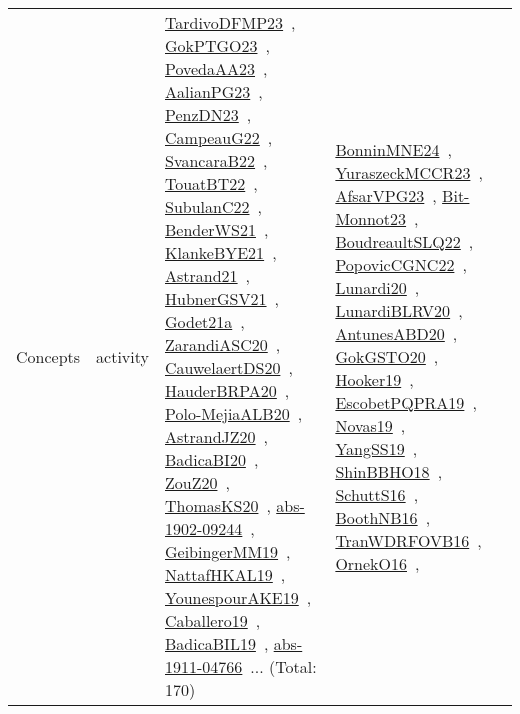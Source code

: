 {\begin{longtable}{lp{3cm}>{\raggedright\arraybackslash}p{6cm}>{\raggedright\arraybackslash}p{6cm}>{\raggedright\arraybackslash}p{8cm}}
Concepts & activity & \href{../works/TardivoDFMP23.pdf}{TardivoDFMP23}~\cite{TardivoDFMP23}, \href{../works/GokPTGO23.pdf}{GokPTGO23}~\cite{GokPTGO23}, \href{../works/PovedaAA23.pdf}{PovedaAA23}~\cite{PovedaAA23}, \href{../works/AalianPG23.pdf}{AalianPG23}~\cite{AalianPG23}, \href{../works/PenzDN23.pdf}{PenzDN23}~\cite{PenzDN23}, \href{../works/CampeauG22.pdf}{CampeauG22}~\cite{CampeauG22}, \href{../works/SvancaraB22.pdf}{SvancaraB22}~\cite{SvancaraB22}, \href{../works/TouatBT22.pdf}{TouatBT22}~\cite{TouatBT22}, \href{../works/SubulanC22.pdf}{SubulanC22}~\cite{SubulanC22}, \href{../works/BenderWS21.pdf}{BenderWS21}~\cite{BenderWS21}, \href{../works/KlankeBYE21.pdf}{KlankeBYE21}~\cite{KlankeBYE21}, \href{../works/Astrand21.pdf}{Astrand21}~\cite{Astrand21}, \href{../works/HubnerGSV21.pdf}{HubnerGSV21}~\cite{HubnerGSV21}, \href{../works/Godet21a.pdf}{Godet21a}~\cite{Godet21a}, \href{../works/ZarandiASC20.pdf}{ZarandiASC20}~\cite{ZarandiASC20}, \href{../works/CauwelaertDS20.pdf}{CauwelaertDS20}~\cite{CauwelaertDS20}, \href{../works/HauderBRPA20.pdf}{HauderBRPA20}~\cite{HauderBRPA20}, \href{../works/Polo-MejiaALB20.pdf}{Polo-MejiaALB20}~\cite{Polo-MejiaALB20}, \href{../works/AstrandJZ20.pdf}{AstrandJZ20}~\cite{AstrandJZ20}, \href{../works/BadicaBI20.pdf}{BadicaBI20}~\cite{BadicaBI20}, \href{../works/ZouZ20.pdf}{ZouZ20}~\cite{ZouZ20}, \href{../works/ThomasKS20.pdf}{ThomasKS20}~\cite{ThomasKS20}, \href{../works/abs-1902-09244.pdf}{abs-1902-09244}~\cite{abs-1902-09244}, \href{../works/GeibingerMM19.pdf}{GeibingerMM19}~\cite{GeibingerMM19}, \href{../works/NattafHKAL19.pdf}{NattafHKAL19}~\cite{NattafHKAL19}, \href{../works/YounespourAKE19.pdf}{YounespourAKE19}~\cite{YounespourAKE19}, \href{../works/Caballero19.pdf}{Caballero19}~\cite{Caballero19}, \href{../works/BadicaBIL19.pdf}{BadicaBIL19}~\cite{BadicaBIL19}, \href{../works/abs-1911-04766.pdf}{abs-1911-04766}~\cite{abs-1911-04766}... (Total: 170) & \href{../works/BonninMNE24.pdf}{BonninMNE24}~\cite{BonninMNE24}, \href{../works/YuraszeckMCCR23.pdf}{YuraszeckMCCR23}~\cite{YuraszeckMCCR23}, \href{../works/AfsarVPG23.pdf}{AfsarVPG23}~\cite{AfsarVPG23}, \href{../works/Bit-Monnot23.pdf}{Bit-Monnot23}~\cite{Bit-Monnot23}, \href{../works/BoudreaultSLQ22.pdf}{BoudreaultSLQ22}~\cite{BoudreaultSLQ22}, \href{../works/PopovicCGNC22.pdf}{PopovicCGNC22}~\cite{PopovicCGNC22}, \href{../works/Lunardi20.pdf}{Lunardi20}~\cite{Lunardi20}, \href{../works/LunardiBLRV20.pdf}{LunardiBLRV20}~\cite{LunardiBLRV20}, \href{../works/AntunesABD20.pdf}{AntunesABD20}~\cite{AntunesABD20}, \href{../works/GokGSTO20.pdf}{GokGSTO20}~\cite{GokGSTO20}, \href{../works/Hooker19.pdf}{Hooker19}~\cite{Hooker19}, \href{../works/EscobetPQPRA19.pdf}{EscobetPQPRA19}~\cite{EscobetPQPRA19}, \href{../works/Novas19.pdf}{Novas19}~\cite{Novas19}, \href{../works/YangSS19.pdf}{YangSS19}~\cite{YangSS19}, \href{../works/ShinBBHO18.pdf}{ShinBBHO18}~\cite{ShinBBHO18}, \href{../works/SchuttS16.pdf}{SchuttS16}~\cite{SchuttS16}, \href{../works/BoothNB16.pdf}{BoothNB16}~\cite{BoothNB16}, \href{../works/TranWDRFOVB16.pdf}{TranWDRFOVB16}~\cite{TranWDRFOVB16}, \href{../works/OrnekO16.pdf}{OrnekO16}~\cite{OrnekO16}, 
\end{longtable}}
